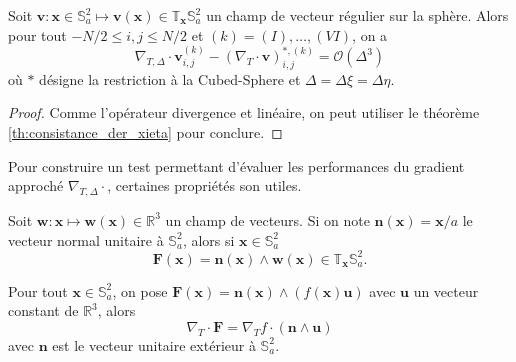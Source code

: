 \begin{proposition}
Soit $\mathbf{v} : \mathbf{x} \in \mathbb{S}_a^2 \mapsto \mathbf{v}(\mathbf{x}) \in \mathbb{T}_{\mathbf{x}} \mathbb{S}_a^2$ un champ de vecteur régulier sur la sphère. Alors pour tout $-N/2 \leq i,j \leq N/2$ et $(k) = (I) , \ldots , (VI)$, on a 
\begin{equation}
\nabla_{T,\Delta} \cdot \mathbf{v}_{i,j}^{(k)} - (\nabla_{T} \cdot \mathbf{v} )_{i,j}^{*,(k)} = \mathcal{O} \left( \Delta^3 \right)
\end{equation}
où $*$ désigne la restriction à la Cubed-Sphere et $\Delta  = \Delta \xi = \Delta \eta$.
\label{prop:accuracy_divergence}
\end{proposition}

\begin{proof}
Comme l'opérateur divergence et linéaire, on peut utiliser le théorème \ref{th:consistance_der_xieta} pour conclure.
\end{proof}

Pour construire un test permettant d'évaluer les performances du gradient approché $\nabla_{T, \Delta} \cdot$, certaines propriétés son utiles.
\begin{lemme}
Soit $\mathbf{w} : \mathbf{x} \mapsto \mathbf{w}(\mathbf{x}) \in \mathbb{R}^3$ un champ de vecteurs. Si on note $ \mathbf{n}(\mathbf{x}) = \mathbf{x}/a$ le vecteur normal unitaire à $\mathbb{S}_a^2$, alors si $\mathbf{x} \in \mathbb{S}_a^2$
\begin{equation}
\mathbf{F}(\mathbf{x}) = \mathbf{n}(\mathbf{x}) \wedge \mathbf{w}(\mathbf{x}) \in \mathbb{T}_{\mathbf{x}} \mathbb{S}_a^2.
\end{equation}
\end{lemme}

\begin{proposition}
Pour tout $\mathbf{x} \in \mathbb{S}_a^2$, 
on pose $\mathbf{F}(\mathbf{x}) = \mathbf{n}(\mathbf{x}) \wedge (f (\mathbf{x}) \mathbf{u})$ 
avec $\mathbf{u}$ un vecteur constant de 
$\mathbb{R}^3$, alors
\begin{equation}
\nabla_T \cdot \mathbf{F} = \nabla_T f \cdot \left( \mathbf{n} \wedge \mathbf{u} \right)
\end{equation}
avec $\mathbf{n}$ est le vecteur unitaire extérieur à $\mathbb{S}_a^2$.
\label{prop:grad-div_link}
\end{proposition}

